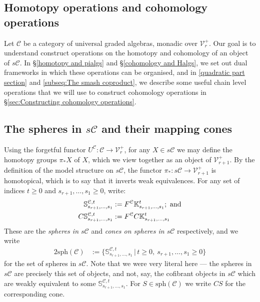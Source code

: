 \documentclass[11pt]{amsart} \renewcommand{\baselinestretch}{1.2}
\theoremstyle{plain}
\numberwithin{equation}{section} %
\theoremstyle{plain}
\numberwithin{equation}{chapter} %
\renewcommand{\to}{\longrightarrow}
\newcommand{\calV}{\mathcal{V}}
\newcommand{\calc}{\mathcal{C}}
\newcommand{\spheres}[1]{\mathrm{sph}(#1)}
\newcommand{\cones}[1]{\mathrm{con}(#1)}
\newcommand{\vect}[2]{\calV^{#1}_{#2}}
\newcommand{\SectionOrChapter}[1]{\section{\textbf{#1}}}
\newcommand{\SubsectionOrSection}[1]{\subsection{#1}}
\begin{document}
\begin{Pi-algebras and cohomology algebras}

\SectionOrChapter{Homotopy operations and cohomology operations}
\label{Pi-algebras and cohomology algebras}
Let $\calc$ be a category of universal graded algebras, monadic over $\vect{+}{r}$. Our goal is to understand construct operations on the homotopy and cohomology of an object of $s\calc$. In \S\ref{homotopy and pialgs} and \S\ref{cohomology and Halgs}, we set out dual frameworks in which these operations can be organised, and in \ref{quadratic part section} and \ref{subseq:The smash coproduct}, we  describe some useful chain level operations that we will use to construct cohomology operations in \S\ref{sec:Constructing cohomology operations}.

\SubsectionOrSection{The spheres in $s\calc$ and their mapping cones}\label{spheres and cones}



Using the forgetful functor $U^\calc:\calc\to \vect{+}{r}$, for any $X\in s\calc$ we may define the homotopy groups $\pi_*X$ of $X$,
which we view together as an object  of $\vect{+}{r+1}$. By the definition of the model structure on $s\calc$, the functor $\pi_*:s\calc\to \vect{+}{r+1}$ is homotopical, which is to say that it inverts weak equivalences. For any set of indices $t\geq0$ and $s_{r+1},\ldots,s_1\geq0$, write:
\begin{alignat*}{2}
\mathbb{S}^{\calc,t}_{s_{r+1},\ldots,s_1}
&:=
F^\calc \mathbb{K}^{t}_{s_{r+1},\ldots,s_1};\textup{ and}
\\
C\mathbb{S}^{\calc,t}_{s_{r+1},\ldots,s_1}
&:=
F^\calc C\mathbb{K}^{t}_{s_{r+1},\ldots,s_1}%
\end{alignat*}
These are the \emph{spheres in $s\calc$} and \emph{cones on spheres in $s\calc$} respectively, and we write
\begin{alignat*}{2}
\spheres{\calc}&:=\bigl\{\mathbb{S}^{\calc,t}_{s_{r+1},\ldots,s_1}\,|\,t\geq0,\ s_{r+1},\ldots,s_1\geq0\bigr\} %
\end{alignat*}
for the set of spheres in $s\calc$. Note that we were very literal here --- the spheres in $s\calc$ are precisely this set of objects, and not, say, the cofibrant objects in $s\calc$ which are weakly equivalent to some $\mathbb{S}^{\calc,t}_{s_{r+1},\ldots,s_1}$. For $S\in \spheres{\calc}$ we write $CS$ for the corresponding cone.


\end{Pi-algebras and cohomology algebras}
\end{document}

